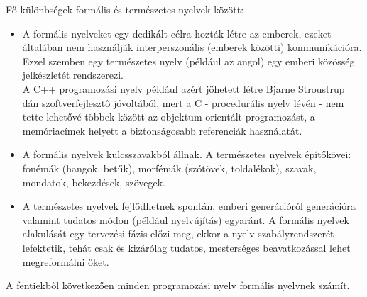 \documentclass[tocnopagenum]{thesis-ekf}
\theoremstyle{definition}
\theoremstyle{remark}
\begin{document}
	Fő különbségek formális és természetes nyelvek között:
	\begin{itemize}
		\item A formális nyelveket egy dedikált célra hozták létre az emberek, ezeket általában nem használják interperszonális (emberek közötti) kommunikációra. Ezzel szemben egy természetes nyelv (például az angol) egy emberi közösség jelkészletét rendszerezi.\\
		A C++ programozási nyelv például azért jöhetett létre Bjarne Stroustrup dán szoftverfejlesztő jóvoltából, mert a C - procedurális nyelv lévén - nem tette lehetővé többek között az objektum-orientált programozást, a memóriacímek helyett a biztonságosabb referenciák használatát. \cite{cpplang1}
		\item A formális nyelvek kulcsszavakból állnak. A természetes nyelvek építőkövei: fonémák (hangok, betűk), morfémák (szótövek, toldalékok), szavak, mondatok, bekezdések, szövegek.
		\item A természetes nyelvek fejlődhetnek spontán, emberi generációról generációra valamint tudatos módon (például nyelvújítás) egyaránt. A formális nyelvek alakulását egy tervezési fázis előzi meg, ekkor a nyelv szabályrendszerét lefektetik, tehát csak és kizárólag tudatos, mesterséges beavatkozással lehet megreformálni őket.
	\end{itemize} \cite{langvid1} \cite{langvid2}

	A fentiekből következően minden programozási nyelv formális nyelvnek számít. 
	
\end{document}
